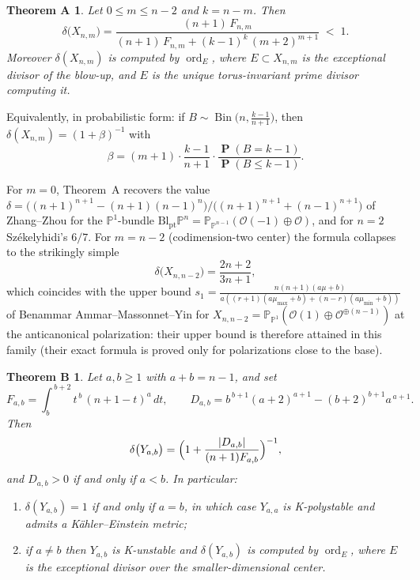 \documentclass[11pt]{amsart}
\newtheorem*{thmA}{Theorem A}
\newtheorem*{thmB}{Theorem B}
\theoremstyle{definition}
\theoremstyle{remark}
\newcommand{\PP}{\mathbb{P}}
\newcommand{\Bl}{\mathrm{Bl}}
\newcommand{\ord}{\operatorname{ord}}
\newcommand{\Bin}{\operatorname{Bin}}
\newcommand{\pr}{\operatorname{\mathbf{P}}}
\begin{document}
\begin{thmA}\label{thm:A}
Let $0\le m\le n-2$ and $k=n-m$. Then
\[
\delta\bigl(X_{n,m}\bigr)
=\frac{(n+1)\,F_{n,m}}{(n+1)\,F_{n,m}+(k-1)^{k}\,(m+2)^{m+1}}\;<\;1 .
\]
Moreover $\delta(X_{n,m})$ is computed by $\ord_E$, where
$E\subset X_{n,m}$ is the exceptional divisor of the blow-up, and $E$
is the unique torus-invariant prime divisor computing it.
\end{thmA}

Equivalently, in probabilistic form: if
$B\sim\Bin\bigl(n,\tfrac{k-1}{n+1}\bigr)$, then
$\delta(X_{n,m})=(1+\beta)^{-1}$ with
\begin{equation}\label{eq:binomform}
\beta=(m+1)\cdot\frac{k-1}{n+1}\cdot
\frac{\pr(B=k-1)}{\pr(B\le k-1)} .
\end{equation}

For $m=0$, Theorem~A recovers the value
$\delta=\bigl((n+1)^{n+1}-(n+1)(n-1)^n\bigr)/\bigl((n+1)^{n+1}+(n-1)^{n+1}\bigr)$
of Zhang--Zhou \cite[Theorem 1.1]{ZZ21} for the $\PP^1$-bundle
$\Bl_{\mathrm{pt}}\PP^n=\PP_{\PP^{n-1}}(\mathcal O(-1)\oplus\mathcal
O)$, and for $n=2$ Sz\'ekelyhidi's $6/7$. For $m=n-2$ (codimension-two
center) the formula collapses to the strikingly simple
\begin{equation}\label{eq:codim2}
\delta\bigl(X_{n,n-2}\bigr)=\frac{2n+2}{3n+1},
\end{equation}
which coincides with the upper bound
$s_1=\tfrac{n(n+1)(a\mu+b)}{a((r+1)(a\mu_{\max}+b)+(n-r)(a\mu_{\min}+b))}$
of Benammar Ammar--Massonnet--Yin \cite[Theorem 1.7]{BMY24} for
$X_{n,n-2}=\PP_{\PP^1}(\mathcal O(1)\oplus\mathcal O^{\oplus(n-1)})$ at
the anticanonical polarization: their upper bound is therefore attained
in this family (their exact formula is proved only for polarizations
close to the base).

\begin{thmB}\label{thm:B}
Let $a,b\ge 1$ with $a+b=n-1$, and set
\[
F_{a,b}=\int_{b}^{\,b+2} t^{\,b}\,(n+1-t)^{a}\,dt,
\qquad
D_{a,b}= b^{\,b+1}(a+2)^{a+1}-(b+2)^{b+1}a^{\,a+1}.
\]
Then
\[
\delta\bigl(Y_{a,b}\bigr)=\Bigl(1+\frac{|D_{a,b}|}{(n+1)F_{a,b}}\Bigr)^{-1},
\]
and $D_{a,b}>0$ if and only if $a<b$. In particular:
\begin{enumerate}[label=\textup{(\roman*)}]
\item $\delta(Y_{a,b})=1$ if and only if $a=b$, in which case $Y_{a,a}$
is K-polystable and admits a K\"ahler--Einstein metric;
\item if $a\ne b$ then $Y_{a,b}$ is K-unstable and $\delta(Y_{a,b})$ is
computed by $\ord_{E}$, where $E$ is the exceptional divisor over the
\emph{smaller-dimensional} center.
\end{enumerate}
\end{thmB}
\end{document}
